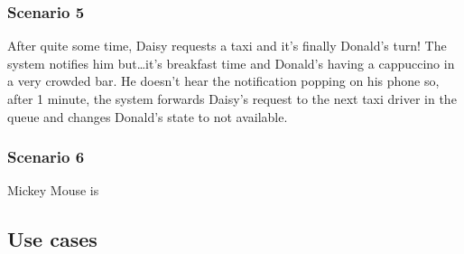 \documentclass{article}
\begin{document}
\subsubsection{Scenario 5}
After quite some time, Daisy requests a taxi and it's finally Donald's turn! The system notifies him but\ldots it's breakfast time and Donald's having a cappuccino in a very crowded bar. He doesn't hear the notification popping on his phone so, after 1 minute, the system forwards Daisy's request to the next taxi driver in the queue and changes Donald's state to not available.
\subsubsection{Scenario 6}
Mickey Mouse is 

\subsection{Use cases}
\end{document}
